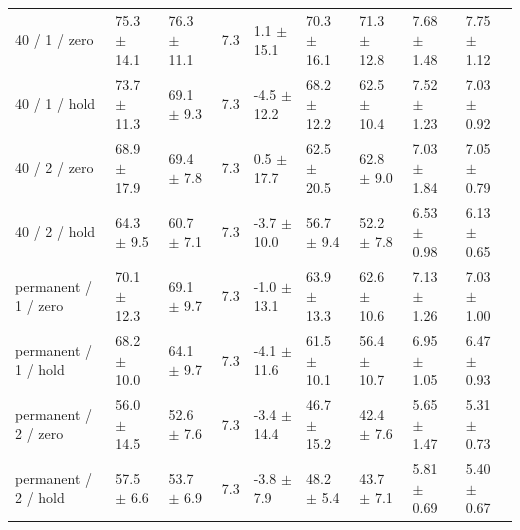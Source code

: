 \begin{tabular}{lllllllll}
40 / 1 / zero & 75.3 $\pm$ 14.1 & 76.3 $\pm$ 11.1 & 7.3 & 1.1 $\pm$ 15.1 & 70.3 $\pm$ 16.1 & 71.3 $\pm$ 12.8 & 7.68 $\pm$ 1.48 & 7.75 $\pm$ 1.12 \\
40 / 1 / hold & 73.7 $\pm$ 11.3 & 69.1 $\pm$ 9.3 & 7.3 & -4.5 $\pm$ 12.2 & 68.2 $\pm$ 12.2 & 62.5 $\pm$ 10.4 & 7.52 $\pm$ 1.23 & 7.03 $\pm$ 0.92 \\
40 / 2 / zero & 68.9 $\pm$ 17.9 & 69.4 $\pm$ 7.8 & 7.3 & 0.5 $\pm$ 17.7 & 62.5 $\pm$ 20.5 & 62.8 $\pm$ 9.0 & 7.03 $\pm$ 1.84 & 7.05 $\pm$ 0.79 \\
40 / 2 / hold & 64.3 $\pm$ 9.5 & 60.7 $\pm$ 7.1 & 7.3 & -3.7 $\pm$ 10.0 & 56.7 $\pm$ 9.4 & 52.2 $\pm$ 7.8 & 6.53 $\pm$ 0.98 & 6.13 $\pm$ 0.65 \\
permanent / 1 / zero & 70.1 $\pm$ 12.3 & 69.1 $\pm$ 9.7 & 7.3 & -1.0 $\pm$ 13.1 & 63.9 $\pm$ 13.3 & 62.6 $\pm$ 10.6 & 7.13 $\pm$ 1.26 & 7.03 $\pm$ 1.00 \\
permanent / 1 / hold & 68.2 $\pm$ 10.0 & 64.1 $\pm$ 9.7 & 7.3 & -4.1 $\pm$ 11.6 & 61.5 $\pm$ 10.1 & 56.4 $\pm$ 10.7 & 6.95 $\pm$ 1.05 & 6.47 $\pm$ 0.93 \\
permanent / 2 / zero & 56.0 $\pm$ 14.5 & 52.6 $\pm$ 7.6 & 7.3 & -3.4 $\pm$ 14.4 & 46.7 $\pm$ 15.2 & 42.4 $\pm$ 7.6 & 5.65 $\pm$ 1.47 & 5.31 $\pm$ 0.73 \\
permanent / 2 / hold & 57.5 $\pm$ 6.6 & 53.7 $\pm$ 6.9 & 7.3 & -3.8 $\pm$ 7.9 & 48.2 $\pm$ 5.4 & 43.7 $\pm$ 7.1 & 5.81 $\pm$ 0.69 & 5.40 $\pm$ 0.67 \\
\bottomrule
\end{tabular}
